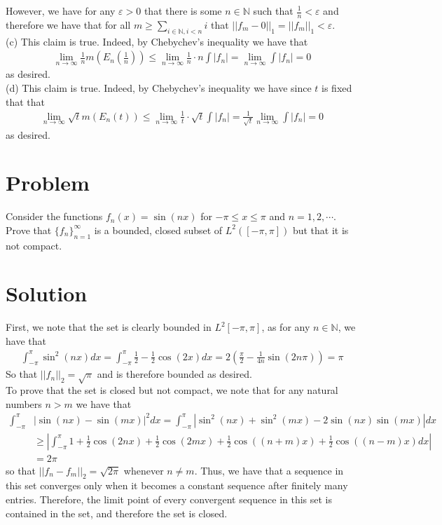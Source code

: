 \documentclass{article}
\begin{document}
\noindent However, we have for any $\varepsilon>0$ that there is some $n\in\mathbb{N}$ such that $\frac{1}{n}<\varepsilon$ and therefore we have that for all $m\geq\sum_{i\in\mathbb{N},i<n}i$ that $||f_m-0||_1=||f_m||_1<\varepsilon$. \\

\noindent (c) This claim is true.  Indeed, by Chebychev's inequality we have that
\begin{align*}
\lim_{n\rightarrow\infty}\frac{1}{n}m(E_n(\frac{1}{n}))\leq\lim_{n\rightarrow\infty}\frac{1}{n}\cdot n\int|f_n|=\lim_{n\rightarrow\infty}\int|f_n|=0
\end{align*}
as desired.\\

\noindent (d) This claim is true.  Indeed, by Chebychev's inequality we have since $t$ is fixed that that
\begin{align*}
\lim_{n\rightarrow\infty}\sqrt{t}m(E_n(t))\leq\lim_{n\rightarrow\infty}\frac{1}{t}\cdot \sqrt{t}\int|f_n|=\frac{1}{\sqrt{t}}\lim_{n\rightarrow\infty}\int|f_n|=0
\end{align*}
as desired.

\section*{Problem}
Consider the functions $f_n(x)=\sin(nx)$ for $-\pi\leq x\leq\pi$ and $n=1,2,\cdots$.  Prove that $\{f_n\}_{n=1}^\infty$ is a bounded, closed subset of $L^2([-\pi,\pi])$ but that it is not compact.\\

\section*{Solution}
First, we note that the set is clearly bounded in $L^2[-\pi,\pi]$, as for any $n\in\mathbb{N}$, we have that
\begin{align*}
\int_{-\pi}^\pi\sin^2(nx)dx=\int_{-\pi}^\pi\frac{1}{2}-\frac{1}{2}\cos(2x)dx=2\left(\frac{\pi}{2}-\frac{1}{4n}\sin(2n\pi)\right)=\pi
\end{align*}
So that $||f_n||_2=\sqrt{\pi}$ and is therefore bounded as desired.\\ 

\noindent To prove that the set is closed but not compact, we note that for any natural numbers $n>m$ we have that
\begin{align*}
\int_{-\pi}^\pi&\left|\sin(nx)-\sin(mx)\right|^2dx=\int_{-\pi}^\pi\left|\sin^2(nx)+\sin^2(mx)-2\sin(nx)\sin(mx)\right|dx\\
&\geq\left|\int_{-\pi}^\pi1+\frac{1}{2}\cos(2nx)+\frac{1}{2}\cos(2mx)+\frac{1}{2}\cos((n+m)x)+\frac{1}{2}\cos((n-m)x)dx\right|\\
&=2\pi
\end{align*}
so that $||f_n-f_m||_2=\sqrt{2\pi}$ whenever $n\neq m$.  Thus, we have that a sequence in this set converges only when it becomes a constant sequence after finitely many entries.  Therefore, the limit point of every convergent sequence in this set is contained in the set, and therefore the set is closed.\\
\end{document}
